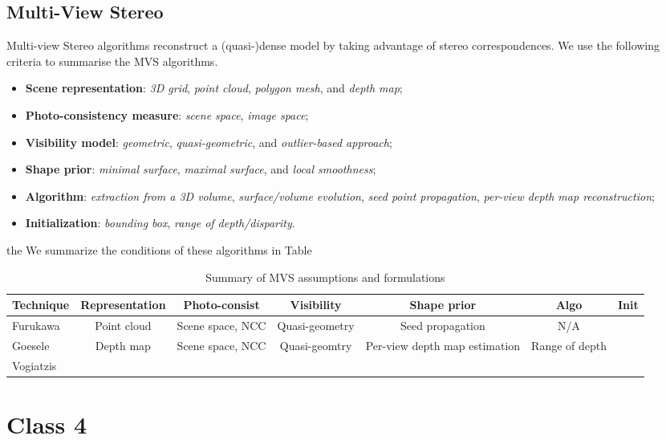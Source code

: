 \subsection{Multi-View Stereo}
Multi-view Stereo algorithms reconstruct a (quasi-)dense model by taking advantage of stereo correspondences. We use the following criteria to summarise the MVS algorithms.
\begin{itemize}
\item \textbf{Scene representation}: \textit{3D grid}, \textit{point cloud}, \textit{polygon mesh}, and \textit{depth map};
\item \textbf{Photo-consistency measure}: \textit{scene space}, \textit{image space};
\item \textbf{Visibility model}: \textit{geometric}, \textit{quasi-geometric}, and \textit{outlier-based approach};
\item \textbf{Shape prior}: \textit{minimal surface}, \textit{maximal surface}, and \textit{local smoothness};
\item \textbf{Algorithm}: \textit{extraction from a 3D volume}, \textit{surface/volume evolution}, \textit{seed point propagation}, \textit{per-view depth map reconstruction};
\item \textbf{Initialization}: \textit{bounding box}, \textit{range of depth/disparity}.
\end{itemize}
the We summarize the conditions of these algorithms in Table~
\begin{table}[h]
  \centering
  \begin{tabular}{l*{6}{c}}
  \hline
  \textbf{Technique} & Representation & Photo-consist & Visibility & Shape prior & Algo & Init\\
  \hline
  Furukawa~\cite{furukawa2010accurate} & Point cloud & Scene space, NCC & Quasi-geometry & Seed propagation & N/A\\
  Goesele~\cite{goesele2006multi} & Depth map & Scene space, NCC & Quasi-geomtry & Per-view depth map estimation & Range of depth\\
  Vogiatzis~\cite{vogiatzis2007multiview} \\
  \hline
  \end{tabular}
  \caption{Summary of MVS assumptions and formulations}
  \label{tab:class_3}
\end{table}

\section{Class 4}
